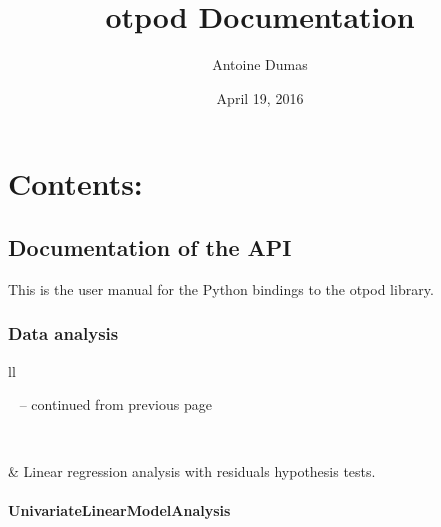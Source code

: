 \documentclass[letterpaper,10pt,english]{sphinxmanual}
\title{otpod Documentation}
\date{April 19, 2016}
\author{Antoine Dumas}
\begin{document}
\maketitle
\tableofcontents
{}\label{index::doc}



\chapter{Contents:}
\label{index:welcome-to-otpod-s-documentation}\label{index:contents}

\section{Documentation of the API}
\label{user_manual::doc}\label{user_manual:documentation-of-the-api}
This is the user manual for the Python bindings to the otpod library.


\subsection{Data analysis}
\label{user_manual:data-analysis}
\begin{longtable}{ll}
\hline
\endfirsthead

%
{{\textsf{\tablename\ \thetable{} -- continued from previous page}}} \\
\hline
\endhead

\hline {} \\ \hline
\endfoot

\endlastfoot


{\hyperref[_generated/otpod.UnivariateLinearModelAnalysis:otpod.UnivariateLinearModelAnalysis]{\emph{}}}
 & 
Linear regression analysis with residuals hypothesis tests.
\\
\hline\end{longtable}



\subsubsection{UnivariateLinearModelAnalysis}
\label{_generated/otpod.UnivariateLinearModelAnalysis:univariatelinearmodelanalysis}\label{_generated/otpod.UnivariateLinearModelAnalysis::doc}
\end{document}
